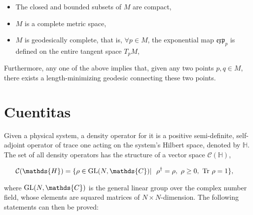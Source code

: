 \documentclass{homework}
\begin{document}
\begin{itemize}
    \item The closed and bounded subsets of $M$ are compact,
    \item $M$ is a complete metric space, 
    \item $M$ is geodesically complete, that is, $\forall p \in M$, the exponential map $\mathfrak{e}\mathfrak{x}\mathfrak{p}_{p}$ is defined on the entire tangent space $T_p M$,
\end{itemize}

Furthermore, any one of the above implies that, given any two points $p, q \in M$, there exists a length-minimizing geodesic connecting these two points. \\

\section{Cuentitas}

Given a physical system, a density operator for it is a positive semi-definite, self-adjoint operator of trace one acting on the system's Hilbert space, denoted by $\mathds{H}$. The set of all density operators has the structure of a vector space $\mathcal{C}(\mathds{H})$,

\begin{equation}
\begin{split}
\mathcal{C}(\mathds{H}) = \{ \rho& \in \textnormal{GL}(N, \mathds{C}) | \blanky
\blanky \rho^\dagger = \rho, 
\blanky \rho \geq 0, \blanky \textnormal{Tr } \rho = 1 \},    
\end{split}
\end{equation}


where $\textnormal{GL}(N, \mathds{C})$ is the general linear group over the complex number field, whose elements are squared matrices of $N \times N$-dimension. The following statements can then be proved:
\end{document}
